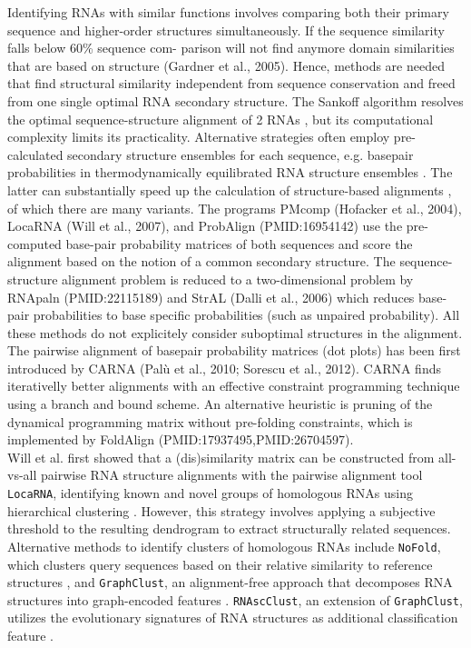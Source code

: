 \documentclass{bmcart}
\newcommand\graphclust{\texttt{GraphClust}}
\newcommand\locarna{\texttt{LocaRNA}}
\begin{document}
Identifying RNAs with similar functions involves comparing both their primary sequence 
and higher-order structures simultaneously. If the
sequence similarity falls below 60\% sequence com-
parison will not find anymore domain similarities that
are based on structure (Gardner et al., 2005). Hence, methods are needed that find structural similarity independent from sequence conservation and freed from one single optimal RNA secondary structure. The Sankoff algorithm resolves
the optimal sequence-structure alignment of 2 RNAs \cite{sankoff85}, 
but its computational complexity limits its practicality. Alternative strategies often 
employ pre-calculated secondary structure ensembles for each sequence, e.g. basepair
probabilities in thermodynamically equilibrated RNA structure ensembles
\cite{McCaskill:1990}. The latter can substantially speed up the calculation
of structure-based alignments \cite{Hofacker15073017}, of which there are many variants.
The programs PMcomp (Hofacker et al., 2004), LocaRNA (Will et al., 2007), and ProbAlign (PMID:16954142) use the pre-computed base-pair probability matrices of both sequences and score the alignment based on the notion of a common secondary structure. The sequence-structure alignment problem is reduced to a two-dimensional problem by RNApaln (PMID:22115189) and StrAL (Dalli et al., 2006) which reduces base-pair probabilities to base specific probabilities (such as unpaired probability). All these methods do not explicitely consider suboptimal structures in the alignment. The pairwise alignment of basepair probability matrices (dot plots) has been first introduced by CARNA (Palù et al., 2010; Sorescu et al., 2012). CARNA finds iterativelly better alignments with an effective constraint programming technique using a branch and bound scheme. An alternative heuristic is pruning of the dynamical programming matrix without pre-folding constraints, which is implemented by FoldAlign (PMID:17937495,PMID:26704597). \\ 

Will et al. first showed that a (dis)similarity matrix can be constructed from all-vs-all pairwise RNA structure alignments with the pairwise alignment tool \locarna{}, identifying known and novel groups of homologous RNAs using hierarchical clustering \cite{Will17432929}. However, this strategy involves applying a subjective threshold to the resulting dendrogram to extract structurally related sequences. Alternative methods to identify clusters of homologous RNAs include \texttt{NoFold}, which clusters query sequences based on their relative similarity to reference structures \cite{Middleton25234928}, and \graphclust{}, an alignment-free approach that decomposes RNA structures into graph-encoded features \cite{Heyne22689765}. \texttt{RNAscClust}, an extension of \graphclust{}, utilizes the evolutionary signatures of RNA structures as additional classification feature \cite{Miladi28334186}. \\
\end{document}
